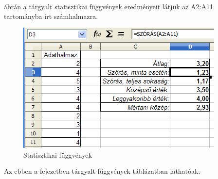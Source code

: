   ábrán a tárgyalt statisztikai függvények
eredményeit látjuk az A2:A11 tartományba írt számhalmazra.

\begin{figure}[!h]
\begin{center}
\includegraphics[width=10.37cm]{oocalcv2-img129.png}
\caption{Statisztikai függvények}\label{StatisztikaiFüggvények2}
\end{center}
\end{figure}

Az ebben a fejezetben tárgyalt függvények 
táblázatban láthatóak.

